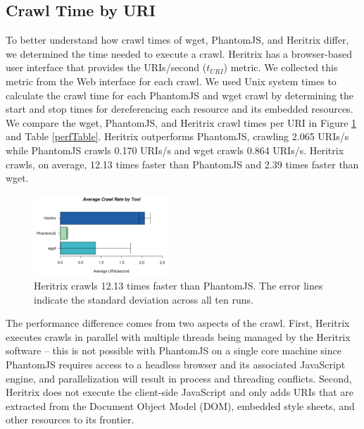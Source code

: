 \documentclass{ipres_proc_article-sp}
\begin{document}

\subsection{Crawl Time by URI}
\label{clock}
To better understand how crawl times of wget, PhantomJS, and Heritrix differ, we determined the time needed to execute a crawl. Heritrix has a browser-based user interface that provides the URIs/second ($t_{URI}$) metric. We collected this metric from the Web interface for each crawl. We used Unix system times to calculate the crawl time for each PhantomJS and wget crawl by determining the start and stop times for dereferencing each resource and its embedded resources. We compare the wget, PhantomJS, and Heritrix crawl times per URI in Figure \ref{crawlrate} and Table \ref{perfTable}. Heritrix outperforms PhantomJS, crawling 2.065 URIs/s while PhantomJS crawls 0.170 URIs/s and wget crawls 0.864 URIs/s. Heritrix crawls, on average, 12.13 times faster than PhantomJS and 2.39 times faster than wget.

\begin{figure}
  \begin{center}
    	\includegraphics[width=0.45\textwidth,keepaspectratio]{./imgs/rateBarStats.png}
  \end{center}
  \caption{Heritrix crawls 12.13 times faster than PhantomJS. The error lines indicate the standard deviation across all ten runs.}
  \label{crawlrate}
\end{figure}

The performance difference comes from two aspects of the crawl. First, Heritrix executes crawls in parallel with multiple threads being managed by the Heritrix software -- this is not possible with PhantomJS on a single core machine since PhantomJS requires access to a headless browser and its associated JavaScript engine, and parallelization will result in process and threading conflicts. Second, Heritrix does not execute the client-side JavaScript and only adds URIs that are extracted from the Document Object Model (DOM), embedded style sheets, and other resources to its frontier. 
\end{document}
